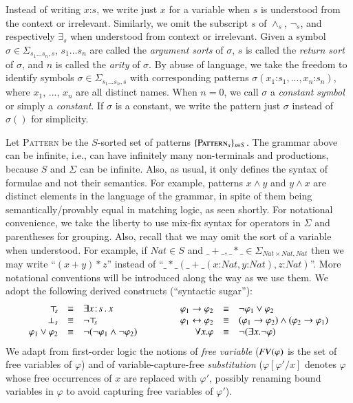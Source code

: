 \documentclass[UTF8,11pt]{article}
\theoremstyle{plain}
\theoremstyle{definition}
\theoremstyle{remark}
\newcommand{\cln}{\texttt{:}}
\newcommand{\Nat}{\textit{Nat}}
\newcommand{\Pattern}{\textsc{Pattern}\xspace}
\newcommand{\ra}{\rightarrow}
\newcommand{\lra}{\leftrightarrow}
\newcommand{\FV}{{\it FV}}
\begin{document}
Instead of writing $x \cln s$, we write just $x$ for a variable when $s$ is
understood from the context or irrelevant.
Similarly, we omit the subscript $s$ of $\wedge_s$, $\neg_s$, and respectively
$\exists_s$ when understood from context or irrelevant.
Given a symbol $\sigma \in \Sigma_{s_1 \ldots s_n,s}$, $s_1 \ldots s_n$ are
called the \emph{argument sorts} of $\sigma$, $s$ is called the
\emph{return sort} of $\sigma$, and $n$ is called the \emph{arity} of
$\sigma$.
By abuse of language, we take the freedom to identify symbols
$\sigma\in\Sigma_{s_1 \ldots s_n,s}$ with corresponding patterns
$\sigma(x_1\cln s_1,...,x_n\cln s_n)$, where $x_1$, ..., $x_n$ are all
distinct names.
When $n = 0$, we call $\sigma$ a \emph{constant symbol} or simply a
\emph{constant}.
If $\sigma$ is a constant, we write the pattern just $\sigma$ instead of
$\sigma()$ for
simplicity.

Let \Pattern be the $S$-sorted set of patterns $\{\Pattern_s\}_{s\in S}$.
The grammar above can be infinite, i.e., can have infinitely many
non-terminals and productions, because $S$ and $\Sigma$ can be
infinite.
Also, as usual, it only defines the syntax of formulae and not
their semantics.
For example, patterns $x \wedge y$ and $y \wedge x$ are distinct elements in
the language of the grammar, in spite of them being semantically/provably
equal in matching logic, as seen shortly.
For notational convenience, we take the liberty to use mix-fix syntax for
operators in $\Sigma$ and parentheses for grouping.
Also, recall that we may omit the sort of a variable when understood.
For example, if $\Nat \in S$ and
$\_+\_, \_*\_ \in \Sigma_{\Nat \times \Nat, \Nat}$
then we may write ``$(x + y)*z$'' instead of
``$\_*\_(\_+\_(x\cln\Nat,y\cln\Nat),z\cln\Nat)$''.
More notational conventions will be introduced along the way
as we use them.
We adopt the following derived constructs (``syntactic sugar''): %
$$\begin{array}{rcl@{\hspace*{10ex}}rcl}
\top_{\!\!s} & \equiv & \exists x\!:\!s \,.\, x &
\varphi_1 \ra \varphi_2 & \equiv & \neg\varphi_1 \vee \varphi_2 \\
\bot_{s} & \equiv & \neg \top_{\!\!s} &
\varphi_1 \lra \varphi_2 & \equiv & (\varphi_1 \ra \varphi_2) \wedge
 (\varphi_2 \ra \varphi_1) \\
\varphi_1 \vee \varphi_2 & \equiv & \neg(\neg\varphi_1\wedge\neg\varphi_2) &
\forall x . \varphi & \equiv & \neg(\exists x . \neg\varphi) \\
\end{array}
$$
We adapt from first-order logic the notions of \emph{free variable}
($\FV(\varphi)$ is the set of free variables of $\varphi$) and of
variable-capture-free \emph{substitution} ($\varphi[\varphi'/x]$ denotes
$\varphi$ whose free occurrences of $x$ are replaced with $\varphi'$, possibly
renaming bound variables in $\varphi$ to avoid capturing free variables of
$\varphi'$).
\end{document}
